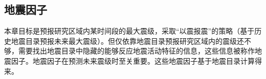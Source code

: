 

\subsection{地震因子}\label{sec:seism_indicator}

本章目标是预报研究区域内某时间段的最大震级，采取“以震报震”的策略（基于历史地震目录预报未来最大震级）。但仅依靠地震目录预报研究区域内的震级还不够，需要找出地震目录中隐藏的能够反应地震活动特征的信息，这些信息被称作地震因子。地震因子在预测未来震级时至关重要。这些地震因子基于地震目录计算得来。

